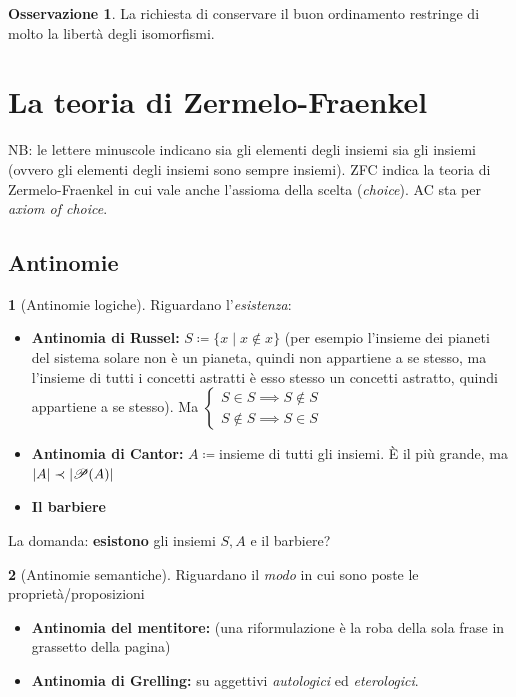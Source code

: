 \documentclass[a4paper,10pt]{article}
\theoremstyle{definition}
\theoremstyle{indentdefinition}
\theoremstyle{indentpostulate}
\theoremstyle{indenttheorem}
\theoremstyle{myremark}
\newtheorem*{rem*}{Osservazione}
\theoremstyle{indentgeneral}
\newtheorem*{gen}{}
\begin{document}
\begin{rem*}
    La richiesta di conservare il buon ordinamento restringe di molto la libertà degli isomorfismi.
\end{rem*}


\pagebreak{}
\section{La teoria di Zermelo-Fraenkel}
NB: le lettere minuscole indicano sia gli elementi degli insiemi sia gli insiemi (ovvero gli elementi degli insiemi sono sempre insiemi). ZFC indica la teoria di Zermelo-Fraenkel in cui vale anche l'assioma della scelta (\textit{choice}). AC sta per \textit{axiom of choice}.
\subsection{Antinomie}
\begin{gen}[Antinomie logiche] Riguardano l'\textit{esistenza}:
\begin{itemize}
    \item \textbf{Antinomia di Russel:} $S\coloneqq\{x\mid x\notin x\}$ (per esempio l'insieme dei pianeti del sistema solare non è un pianeta, quindi non appartiene a se stesso, ma l'insieme di tutti i concetti astratti è esso  stesso un concetti astratto, quindi appartiene a se stesso). Ma $\begin{cases}
        S\in S\implies S\notin S\\
        S\notin S\implies S\in S
    \end{cases}$ \lightning
    \item \textbf{Antinomia di Cantor:} $A\coloneqq$insieme di tutti gli insiemi. È il più grande, ma $\abs{A}\prec\abs{\mathscr{P}(A)}$ \lightning
    \item \textbf{Il barbiere}
\end{itemize}
La domanda: \textbf{esistono} gli insiemi $S,A$ e il barbiere?
\end{gen}

\begin{gen}[Antinomie semantiche] Riguardano il \textit{modo} in cui sono poste le proprietà/proposizioni
\begin{itemize}
    \item \textbf{Antinomia del mentitore:} (una riformulazione è la roba della sola frase in grassetto della pagina)
    \item \textbf{Antinomia di Grelling:} su aggettivi \textit{autologici} ed \textit{eterologici}.
\end{itemize}
\end{gen}
\end{document}
